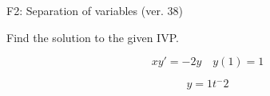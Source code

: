 \begin{exercise}
  \begin{exerciseTitle}F2: Separation of variables (ver. 38)\end{exerciseTitle}
  \begin{exerciseStatement}
    
Find the solution to the given IVP.

    
\[xy'= -2 y \hspace{1em} y( 1 ) = 1\]

  \end{exerciseStatement}
  \begin{exerciseAnswer}
    
\[y= 1 t^ -2\]

  \end{exerciseAnswer}
\end{exercise}
